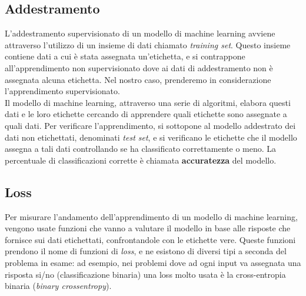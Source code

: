\subsection*{Addestramento} L'addestramento supervisionato di un modello di machine learning avviene attraverso l'utilizzo di un insieme di dati chiamato \textit{training set}. Questo insieme contiene dati a cui è stata assegnata un'etichetta, e si contrappone all'apprendimento non supervisionato dove ai dati di addestramento non è assegnata alcuna etichetta. Nel nostro caso, prenderemo in considerazione l'apprendimento supervisionato.\\
Il modello di machine learning, attraverso una serie di algoritmi, elabora questi dati e le loro etichette cercando di apprendere quali etichette sono assegnate a quali dati. Per verificare l'apprendimento, si sottopone al modello addestrato dei dati non etichettati, denominati \textit{test set}, e si verificano le etichette che il modello assegna a tali dati controllando se ha classificato correttamente o meno. La percentuale di classificazioni corrette è chiamata \textbf{accuratezza} del modello.

\subsection*{Loss} Per misurare l'andamento dell'apprendimento di un modello di machine learning, vengono usate funzioni che vanno a valutare il modello in base alle risposte che fornisce sui dati etichettati, confrontandole con le etichette vere. Queste funzioni prendono il nome di funzioni di \textit{loss}, e ne esistono di diversi tipi a seconda del problema in esame: ad esempio, nei problemi dove ad ogni input va assegnata una risposta si/no (classificazione binaria) una loss molto usata è la cross-entropia binaria (\textit{binary crossentropy}).

